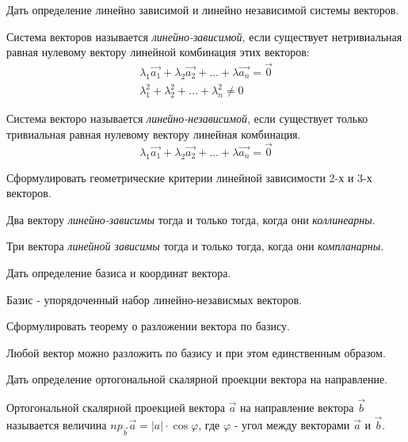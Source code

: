 \begin{question}
  Дать определение линейно зависимой и линейно независимой системы векторов.
\end{question}
\begin{answer}
  Система векторов называется \textit{линейно-зависимой}, если существует нетривиальная равная нулевому вектору линейной комбинация этих векторов:
  \begin{gather*}
    \lambda_1 \vec{a_1} + \lambda_2 \vec{a_2} + \ldots + \lambda \vec{a_n} = \vec{0} \\
    \lambda_1^2 + \lambda_2^2 + \ldots + \lambda_n^2 \neq 0
  \end{gather*}

  Система векторо называется \textit{линейно-независимой}, если существует только тривиальная равная нулевому вектору линейная комбинация.
  \[
    \lambda_1 \vec{a_1} + \lambda_2 \vec{a_2} + \ldots + \lambda \vec{a_n} = \vec{0}
  \] 
\end{answer}

\begin{question}
  Сформулировать геометрические критерии линейной зависимости 2-х и 3-х векторов.
\end{question}
\begin{answer}
  Два вектору \textit{линейно-зависимы} тогда и только тогда, когда они \textit{коллинеарны}.

  Три вектора \textit{линейной зависимы} тогда и только тогда, когда они \textit{компланарны}. 
\end{answer}

\begin{question}
  Дать определение базиса и координат вектора.
\end{question}
\begin{answer}
  Базис - упорядоченный набор линейно-независмых векторов. 
\end{answer}

\begin{question}
  Сформулировать теорему о разложении вектора по базису. 
\end{question}
\begin{answer}
  Любой вектор можно разложить по базису и при этом единственным образом.
\end{answer}

\begin{question}
  Дать определение ортогональной скалярной проекции вектора на направление.
\end{question}
\begin{answer}
  Ортогональной скалярной проекцией вектора $\vec{a}$ на направление вектора $\vec{b}$ называется величина $np_{\vec{b}}\vec{a} = |a|\cdot \cos \varphi$, где $\varphi$ - угол между векторами $\vec{a}$ и $\vec{b}$.
\end{answer}
 
